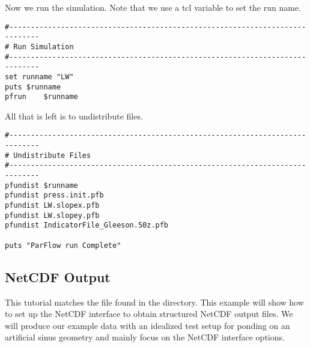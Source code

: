Now we run the simulation.  Note that we use a tcl variable to set the run name.

\begin{verbatim}
#-----------------------------------------------------------------------------
# Run Simulation
#-----------------------------------------------------------------------------
set runname "LW"
puts $runname
pfrun    $runname
\end{verbatim}

All that is left is to undistribute files.

\begin{verbatim}
#-----------------------------------------------------------------------------
# Undistribute Files
#-----------------------------------------------------------------------------
pfundist $runname
pfundist press.init.pfb
pfundist LW.slopex.pfb
pfundist LW.slopey.pfb
pfundist IndicatorFile_Gleeson.50z.pfb

puts "ParFlow run Complete"
\end{verbatim}


\subsection{NetCDF Output}

This tutorial matches the  file found in the 
directory. This example will show how to set up the NetCDF interface to obtain
structured NetCDF output files. We will produce our example data with an
idealized test setup for ponding on an artificial sinus geometry and mainly
focus on the NetCDF interface options.

